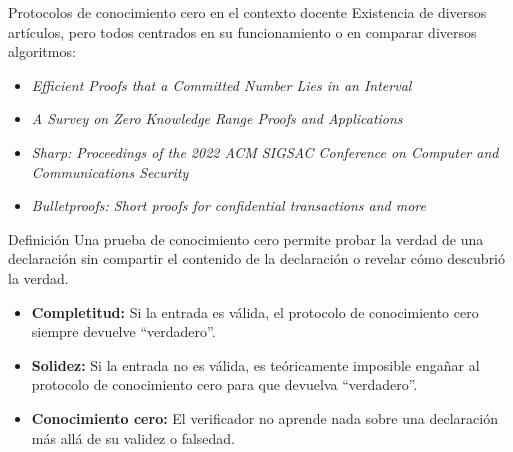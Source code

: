\documentclass[8pt,xcolor=dvipsnames]{beamer}
\begin{document}

\begin{frame}[fragile]{Protocolos de conocimiento cero en el contexto docente}
    Existencia de diversos artículos, pero todos centrados en su funcionamiento o en comparar diversos algoritmos:
    \begin{itemize}
        \item \textit{Efficient Proofs that a Committed Number Lies in an Interval} \cite{Boudot}
        \item \textit{A Survey on Zero Knowledge Range Proofs and Applications} \cite{Survey}
        \item \textit{Sharp: Proceedings of the 2022 ACM SIGSAC Conference on Computer and Communications Security} \cite{Sharp}
        \item \textit{Bulletproofs: Short proofs for confidential transactions and more} \cite{Bulletproofs}
    \end{itemize}
\end{frame}


\begin{frame}[fragile]{Definición}
    Una prueba de conocimiento cero permite probar la verdad de una declaración sin compartir el contenido de la declaración o revelar cómo descubrió la verdad.
    \begin{itemize}
        \item \textbf{Completitud:} Si la entrada es válida, el protocolo de conocimiento cero siempre devuelve ``verdadero''.
        \item \textbf{Solidez:} Si la entrada no es válida, es teóricamente imposible engañar al protocolo de conocimiento cero para que devuelva ``verdadero''.
        \item \textbf{Conocimiento cero:} El verificador no aprende nada sobre una declaración más allá de su validez o falsedad.
    \end{itemize}
\end{frame}

\end{document}
